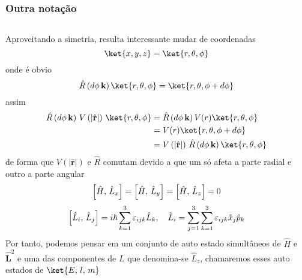 \documentclass[12pt,brazil,table]{beamer}
\begin{document}
\begin{frame}
  \frametitle{Outra notação}
  \fontsize{7pt}{11pt}\selectfont
  
  \begin{columns}[T]
  
  Aproveitando a simetria, resulta interessante mudar de coordenadas\vspace*{-0.5cm}
  \[
   \ket{x,y,z} = \ket{r,\theta,\phi}\vspace*{-0.5cm}
  \]
  onde é obvio\vspace*{-0.25cm}
  \[
    \hat{R}\left( d\phi\, \mathbf{k}\right)\ket{r,\theta,\phi} = \ket{r,\theta,\phi + d\phi}\vspace*{-0.5cm}
  \]
  assim\vspace*{-0.25cm}
  \[
    \begin{align*}
      \hat{R}\left( d\phi\, \mathbf{k}\right) \, V\left(  \left| \hat{\mathbf{r}}\right|\right) \, \ket{r,\theta,\phi} &= \hat{R}\left( d\phi\, \mathbf{k}\right)V(r)\ket{r,\theta,\phi}\\
      &=V(r)\ket{r,\theta,\phi + d\phi}\\
      &=V\left(  \left| \hat{\mathbf{r}}\right|\right) \, \hat{R}\left( d\phi\, \mathbf{k}\right)\ket{r,\theta,\phi}
    \end{align*}\vspace*{-0.25cm}
  \]
  de forma que $V\left(  \left| \hat{\mathbf{r}}\right|\right)$ e $\hat{R}$ comutam devido a que um só afeta a parte radial e outro a parte angular
  \[
   \left[\hat{H},\, \hat{L}_x\right]= \left[\hat{H},\, \hat{L}_y\right] = \left[\hat{H},\, \hat{L}_z\right] = 0\vspace*{-0.25cm}
  \]
  \[
   \left[\hat{L}_i,\, \hat{L}_j\right] = i\hbar \sum_{k=1}^3\varepsilon_{ijk}\hat{L}_k, \quad  \hat{L}_i = \sum_{j=1}^3 \sum_{k=1}^3\varepsilon_{ijk}\hat{x}_j \hat{p}_k \vspace*{-0.25cm}
  \]  
  Por tanto, podemos pensar em um conjunto de auto estado simultâneos de $\hat{H}$ e $\hat{\mathbf{L}}^2$ e uma das componentes de $L$ que denomina-se $\hat{L}_z$, chamaremos esses auto estados de $\ket{E,\,l,\, m}$
  
  \vspace*{-0.8cm}
  

\end{columns}
\end{frame}
\end{document}
